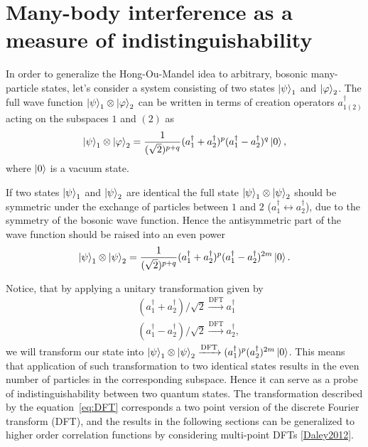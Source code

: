 \section{Many-body interference as a measure of indistinguishability}
In order to generalize the Hong-Ou-Mandel idea to arbitrary, bosonic many-particle states, let's consider a system consisting of two states $\left|\psi\right\rangle_1$ and $\left|\varphi\right\rangle_2$. The full wave function $\left|\psi\right\rangle_1 \otimes \left|\varphi\right\rangle_2$ can be written in terms of creation operators $a_{1(2)}^{\dagger}$ acting on the subspaces $1$ and $(2)$ as
\begin{equation}
\left|\psi\right\rangle_1 \otimes \left|\varphi\right\rangle_2 = \frac{1}{(\sqrt{2})^{p+q}}(a^{\dagger}_1 + a^{\dagger}_2)^p(a^{\dagger}_1 - a^{\dagger}_2)^q\left|0\right\rangle,
\end{equation}
where $\left|0\right\rangle$ is a vacuum state.

If two states $\left|\psi\right\rangle_1$ and $\left|\psi\right\rangle_2$ are identical the full state $\left|\psi\right\rangle_1 \otimes \left|\psi\right\rangle_2$ should be symmetric under the exchange of particles between $1$ and $2$ ($a_{1}^{\dagger} \leftrightarrow a_2^{\dagger}$), due to the symmetry of the bosonic wave function. Hence the antisymmetric part of the wave function should be raised into an even power
\begin{equation}
\left|\psi\right\rangle_1 \otimes \left|\psi\right\rangle_2 = \frac{1}{(\sqrt{2})^{p+q}}(a^{\dagger}_1 + a^{\dagger}_2)^p(a^{\dagger}_1 - a^{\dagger}_2)^{2m}\left|0\right\rangle.
\end{equation}

Notice, that by applying a unitary transformation given by
\begin{equation}
\begin{aligned}
& (a_{1}^{\dagger} + a_{2}^{\dagger} )/\sqrt{2} \xrightarrow[]{\text{DFT}} a_{1}^{\dagger} \\
& (a_{1}^{\dagger} - a_{2}^{\dagger} )/\sqrt{2} \xrightarrow[]{\text{DFT}} a_{2}^{\dagger},
\end{aligned}
\label{eq:DFT}
\end{equation}
we will transform our state into $\left|\psi\right\rangle_1 \otimes \left|\psi\right\rangle_2 \xrightarrow[]{\text{DFT}} (a^{\dagger}_1)^p (a^{\dagger}_2)^{2m}\left|0\right\rangle$. This means that application of such transformation to two identical states results in the even number of particles in the corresponding subspace. Hence it can serve as a probe of indistinguishability between two quantum states. The transformation described by the equation~\ref{eq:DFT} corresponds a two point version of the discrete Fourier transform (DFT), and the results in the following sections can be generalized to higher order correlation functions by considering multi-point DFTs \ref{Daley2012}.

